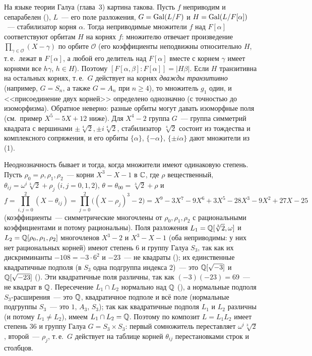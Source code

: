 \begin{aside}[2.4d]
На языке теории Галуа (глава~3) картина такова. Пусть $f$ неприводим и сепарабелен (), $L$~--- его поле разложения,
$G=\operatorname{Gal}(L/F)$ и $H=\operatorname{Gal}(L/F[\alpha])$~--- стабилизатор корня $\alpha$. Тогда неприводимые множители $f$ над $F[\alpha]$
соответствуют орбитам $H$ на корнях $f$: множителю отвечает произведение $\prod_{\gamma\in\mathcal O}(X-\gamma)$ по
орбите $\mathcal O$ (его коэффициенты неподвижны относительно $H$, т.\,е.\ лежат в $F[\alpha]$, а любой его делитель над
$F[\alpha]$ вместе с корнем $\gamma$ имеет корнями все $h\gamma$, $h\in H$). Поэтому $[F[\alpha,\beta]:F[\alpha]]=|H\beta|$.
Если $H$ транзитивна на остальных корнях, т.\,е.\ $G$ действует на корнях \emph{дважды транзитивно} (например,
$G=S_n$, а также $G=A_n$ при $n\ge4$), то множитель $g_1$ один, и <<присоединение двух корней>> определено однозначно (с точностью до изоморфизма).
Обратное неверно: разные орбиты могут давать изоморфные поля (см.\ пример $X^5-5X+12$ ниже). Для $X^4-2$ группа
$G$~--- группа симметрий квадрата с вершинами $\pm\sqrt[4]2,\pm i\sqrt[4]2$, стабилизатор $\sqrt[4]2$ состоит из
тождества и комплексного сопряжения, и его орбиты $\{\alpha\}$, $\{-\alpha\}$, $\{\pm i\alpha\}$ дают множители из
(1).

Неоднозначность бывает и тогда, когда множители имеют одинаковую степень. Пусть $\rho_0=\rho,\rho_1,\rho_2$~--- корни
$X^3-X-1$ в $\mathbb C$, где $\rho$ вещественный, $\theta_{ij}=\omega^i\sqrt[3]2+\rho_j$ ($i,j=0,1,2$), $\theta=\theta_{00}=\sqrt[3]2+\rho$ и
\[
f=\prod_{i,j=0}^{2}(X-\theta_{ij})=\prod_{j=0}^{2}\bigl((X-\rho_j)^3-2\bigr)=X^9-3X^7-9X^6+3X^5-28X^3-9X^2+27X-25
\]
(коэффициенты~--- симметрические многочлены от $\rho_0,\rho_1,\rho_2$ с рациональными коэффициентами и потому
рациональны). Поля разложения $L_1=\mathbb Q[\sqrt[3]2,\omega]$ и $L_2=\mathbb Q[\rho_0,\rho_1,\rho_2]$ многочленов $X^3-2$ и $X^3-X-1$
(оба неприводимы: у них нет рациональных корней) имеют степень $6$ и группу Галуа $S_3$, так как их дискриминанты
$-108=-3\cdot6^2$ и $-23$~--- не квадраты (); их единственные квадратичные подполя (в $S_3$ одна подгруппа
индекса $2$)~--- это $\mathbb Q[\sqrt{-3}]$ и $\mathbb Q[\sqrt{-23}]$ (). Эти квадратичные поля различны, так как
$(-3)(-23)=69$~--- не квадрат в $\mathbb Q$. Пересечение $L_1\cap L_2$ нормально над $\mathbb Q$ (), а нормальные подполя
$S_3$-расширения~--- это $\mathbb Q$, квадратичное подполе и всё поле (нормальные подгруппы $S_3$~--- это $1$, $A_3$, $S_3$);
так как квадратичные подполя $L_1$ и $L_2$ различны (и потому $L_1\ne L_2$), имеем $L_1\cap L_2=\mathbb Q$. Поэтому по
 композит $L=L_1L_2$ имеет степень $36$ и группу Галуа $G=S_3\times S_3$: первый сомножитель переставляет
$\omega^i\sqrt[3]2$, второй~--- $\rho_j$, т.\,е.\ $G$ действует на таблице корней $\theta_{ij}$ перестановками строк и
столбцов.


\end{aside}
